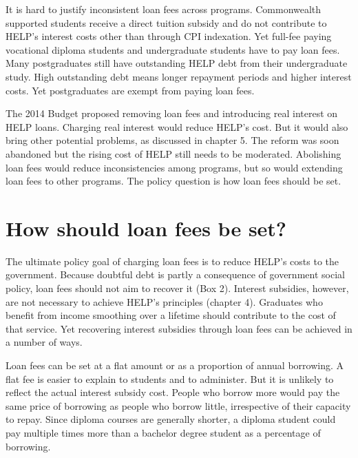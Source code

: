 \documentclass[embargoed]{grattan}
\begin{document}
It is hard to justify inconsistent loan fees across programs. Commonwealth supported students receive a direct tuition subsidy and do not contribute to HELP's interest costs other than through CPI indexation. Yet full-fee paying vocational diploma students and undergraduate students have to pay loan fees. Many postgraduates still have outstanding HELP debt from their undergraduate study. High outstanding debt means longer repayment periods and higher interest costs. Yet postgraduates are exempt from paying loan fees.

The 2014 Budget proposed removing loan fees and introducing real interest on HELP loans. Charging real interest would reduce HELP's cost. But it would also bring other potential problems, as discussed in chapter 5. The reform was soon abandoned but the rising cost of HELP still needs to be moderated. Abolishing loan fees would reduce inconsistencies among programs, but so would extending loan fees to other programs. The policy question is how loan fees should be set.

\section{How should loan fees be set?}\label{how-should-loan-fees-be-set}

The ultimate policy goal of charging loan fees is to reduce HELP's costs to the government. Because doubtful debt is partly a consequence of government social policy, loan fees should not aim to recover it (Box 2). Interest subsidies, however, are not necessary to achieve HELP's principles (chapter 4). Graduates who benefit from income smoothing over a lifetime should contribute to the cost of that service. Yet recovering interest subsidies through loan fees can be achieved in a number of ways.

Loan fees can be set at a flat amount or as a proportion of annual borrowing. A flat fee is easier to explain to students and to administer. But it is unlikely to reflect the actual interest subsidy cost. People who borrow more would pay the same price of borrowing as people who borrow little, irrespective of their capacity to repay. Since diploma courses are generally shorter, a diploma student could pay multiple times more than a bachelor degree student as a percentage of borrowing.
\end{document}
